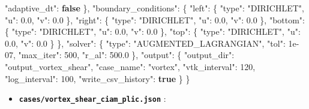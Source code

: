 \documentclass[
  10pt,
]{article}
\newenvironment{Shaded}{}{}
\newcommand{\DataTypeTok}[1]{\textcolor[rgb]{0.56,0.13,0.00}{#1}}
\newcommand{\DecValTok}[1]{\textcolor[rgb]{0.25,0.63,0.44}{#1}}
\newcommand{\FloatTok}[1]{\textcolor[rgb]{0.25,0.63,0.44}{#1}}
\newcommand{\FunctionTok}[1]{\textcolor[rgb]{0.02,0.16,0.49}{#1}}
\newcommand{\KeywordTok}[1]{\textcolor[rgb]{0.00,0.44,0.13}{\textbf{#1}}}
\newcommand{\StringTok}[1]{\textcolor[rgb]{0.25,0.44,0.63}{#1}}
\providecommand{\tightlist}{%
  \setlength{\itemsep}{0pt}\setlength{\parskip}{0pt}}
\begin{document}
\begin{Shaded}
\begin{Highlighting}[]
    \DataTypeTok{"adaptive\_dt"}\FunctionTok{:} \KeywordTok{false}
  \FunctionTok{\},}
  \DataTypeTok{"boundary\_conditions"}\FunctionTok{:} \FunctionTok{\{}
    \DataTypeTok{"left"}\FunctionTok{:} \FunctionTok{\{}
      \DataTypeTok{"type"}\FunctionTok{:} \StringTok{"DIRICHLET"}\FunctionTok{,}
      \DataTypeTok{"u"}\FunctionTok{:} \FloatTok{0.0}\FunctionTok{,}
      \DataTypeTok{"v"}\FunctionTok{:} \FloatTok{0.0}
    \FunctionTok{\},}
    \DataTypeTok{"right"}\FunctionTok{:} \FunctionTok{\{}
      \DataTypeTok{"type"}\FunctionTok{:} \StringTok{"DIRICHLET"}\FunctionTok{,}
      \DataTypeTok{"u"}\FunctionTok{:} \FloatTok{0.0}\FunctionTok{,}
      \DataTypeTok{"v"}\FunctionTok{:} \FloatTok{0.0}
    \FunctionTok{\},}
    \DataTypeTok{"bottom"}\FunctionTok{:} \FunctionTok{\{}
      \DataTypeTok{"type"}\FunctionTok{:} \StringTok{"DIRICHLET"}\FunctionTok{,}
      \DataTypeTok{"u"}\FunctionTok{:} \FloatTok{0.0}\FunctionTok{,}
      \DataTypeTok{"v"}\FunctionTok{:} \FloatTok{0.0}
    \FunctionTok{\},}
    \DataTypeTok{"top"}\FunctionTok{:} \FunctionTok{\{}
      \DataTypeTok{"type"}\FunctionTok{:} \StringTok{"DIRICHLET"}\FunctionTok{,}
      \DataTypeTok{"u"}\FunctionTok{:} \FloatTok{0.0}\FunctionTok{,}
      \DataTypeTok{"v"}\FunctionTok{:} \FloatTok{0.0}
    \FunctionTok{\}}
  \FunctionTok{\},}
  \DataTypeTok{"solver"}\FunctionTok{:} \FunctionTok{\{}
    \DataTypeTok{"type"}\FunctionTok{:} \StringTok{"AUGMENTED\_LAGRANGIAN"}\FunctionTok{,}
    \DataTypeTok{"tol"}\FunctionTok{:} \DecValTok{1e{-}07}\FunctionTok{,}
    \DataTypeTok{"max\_iter"}\FunctionTok{:} \DecValTok{500}\FunctionTok{,}
    \DataTypeTok{"r\_al"}\FunctionTok{:} \FloatTok{500.0}
  \FunctionTok{\},}
  \DataTypeTok{"output"}\FunctionTok{:} \FunctionTok{\{}
    \DataTypeTok{"output\_dir"}\FunctionTok{:} \StringTok{"output\_vortex\_shear"}\FunctionTok{,}
    \DataTypeTok{"case\_name"}\FunctionTok{:} \StringTok{"vortex"}\FunctionTok{,}
    \DataTypeTok{"vtk\_interval"}\FunctionTok{:} \DecValTok{120}\FunctionTok{,}
    \DataTypeTok{"log\_interval"}\FunctionTok{:} \DecValTok{100}\FunctionTok{,}
    \DataTypeTok{"write\_csv\_history"}\FunctionTok{:} \KeywordTok{true}
  \FunctionTok{\}}
\FunctionTok{\}}
\end{Highlighting}
\end{Shaded}

\begin{itemize}
\tightlist
\item
  \textbf{\texttt{cases/vortex\_shear\_ciam\_plic.json}} :
\end{itemize}
\end{document}
